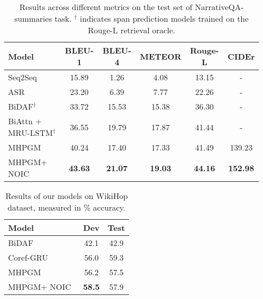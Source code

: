 \documentclass[11pt,a4paper]{article}
\newcommand{\baselineAbbv}{MHPGM}
\newcommand{\fullModel}{NOIC}
\begin{document}
\begin{table*}[t]
    \centering
    \begin{small}
    \begin{tabular}{lccccc}
    \toprule
    \textbf{Model} & \textbf{BLEU-1} & \textbf{BLEU-4} & \textbf{METEOR} & \textbf{Rouge-L} & \textbf{CIDEr}\\
    \midrule
    Seq2Seq \cite{kovcisky2017narrativeqa} & 15.89 & 1.26 & 4.08 & 13.15 & - \\
    ASR \cite{kovcisky2017narrativeqa} & 23.20 & 6.39 & 7.77 & 22.26 & -\\
    BiDAF$^\dagger$ \cite{kovcisky2017narrativeqa} & 33.72 & 15.53 & 15.38 & 36.30 & -\\
    BiAttn + MRU-LSTM$^\dagger$ \cite{tay2018multi} & 36.55 & 19.79 & 17.87 & 41.44 & -\\
    \midrule\midrule
    \baselineAbbv & 40.24 & 17.40 & 17.33 & 41.49 & 139.23 \\
    \baselineAbbv + \fullModel & \bf{43.63} & \bf{21.07} & \bf{19.03} & \bf{44.16} & \bf{152.98} \\
    \bottomrule
    \end{tabular}
    \end{small}
    \vspace{-5pt}
    \caption{Results across different metrics on the test set of NarrativeQA-summaries task.
    $^\dagger$ indicates span prediction models trained on the Rouge-L retrieval oracle.}
    \label{tab:resultsNQA}
    \vspace{-7pt}
\end{table*}
 \begin{table}[t]
	\centering
    \begin{small}
    \begin{tabular}{lcc} \toprule
    \textbf{Model} & \textbf{Dev} & \textbf{Test}\\\midrule
    BiDAF \cite{welbl2017constructing} & 42.1 & 42.9 \\
    Coref-GRU \cite{dhingra2018neural} & 56.0 & 59.3 \\
    \midrule
    \baselineAbbv & 56.2 & 57.5 \\
    \baselineAbbv + \fullModel\ & \bf 58.5 & 57.9 \\
    \bottomrule
    \end{tabular}
    \end{small}
    \vspace{-5pt}
    \caption{Results of our models on WikiHop dataset, measured in \% accuracy.}
    \label{tab:wikihop_results}
    \vspace{-8pt}
\end{table}
  
\end{document}
